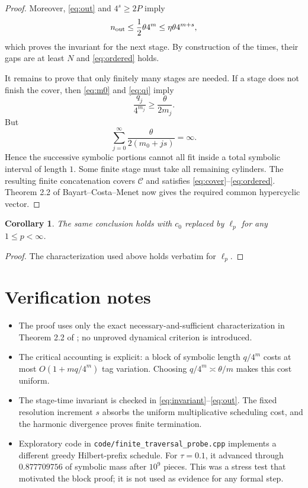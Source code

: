 \documentclass[11pt]{article}
\newtheorem{corollary}[theorem]{Corollary}
\newcommand{\C}{\mathcal C}
\begin{document}
\begin{proof}
Moreover, \eqref{eq:out} and \(4^s\geq2P\) imply
\[
 n_{\rm out}\leq\frac12\theta4^m
 \leq\eta\theta4^{m+s},
\]
which proves the invariant for the next stage.  By construction of the
times, their gaps are at least \(N\) and \eqref{eq:ordered} holds.

It remains to prove that only finitely many stages are needed.  If a stage
does not finish the cover, then \eqref{eq:m0} and \eqref{eq:qj} imply
\[
 \frac{q_j}{4^{m_j}}
 \geq\frac{\theta}{2m_j}.
\]
But
\[
 \sum_{j=0}^{\infty}\frac{\theta}{2(m_0+js)}=\infty.
\]
Hence the successive symbolic portions cannot all fit inside a total
symbolic interval of length \(1\).  Some finite stage must take all remaining
cylinders.  The resulting finite concatenation covers \(\C\) and satisfies
\eqref{eq:cover}--\eqref{eq:ordered}.  Theorem 2.2 of
Bayart--Costa--Menet now gives the required common hypercyclic vector.
\end{proof}

\begin{corollary}
The same conclusion holds with \(c_0\) replaced by \(\ell_p\) for any
\(1\leq p<\infty\).
\end{corollary}

\begin{proof}
The characterization used above holds verbatim for \(\ell_p\).
\end{proof}

\section*{Verification notes}

\begin{itemize}[leftmargin=2em]
\item The proof uses only the exact necessary-and-sufficient characterization
  in Theorem 2.2 of \cite{BayartCostaMenet}; no unproved dynamical criterion
  is introduced.
\item The critical accounting is explicit: a block of symbolic length
  \(q/4^m\) costs at most \(O(1+m q/4^m)\) tag variation.
  Choosing \(q/4^m\asymp\theta/m\) makes this cost uniform.
\item The stage-time invariant is checked in \eqref{eq:invariant}--\eqref{eq:out}.
  The fixed resolution increment \(s\) absorbs the uniform multiplicative
  scheduling cost, and the harmonic divergence proves finite termination.
\item Exploratory code in \texttt{code/finite\_traversal\_probe.cpp} implements
  a different greedy Hilbert-prefix schedule.  For \(\tau=0.1\), it advanced
  through \(0.877709756\) of symbolic mass after \(10^9\) pieces.  This was a
  stress test that motivated the block proof; it is not used as evidence for
  any formal step.
\end{itemize}
\end{document}
